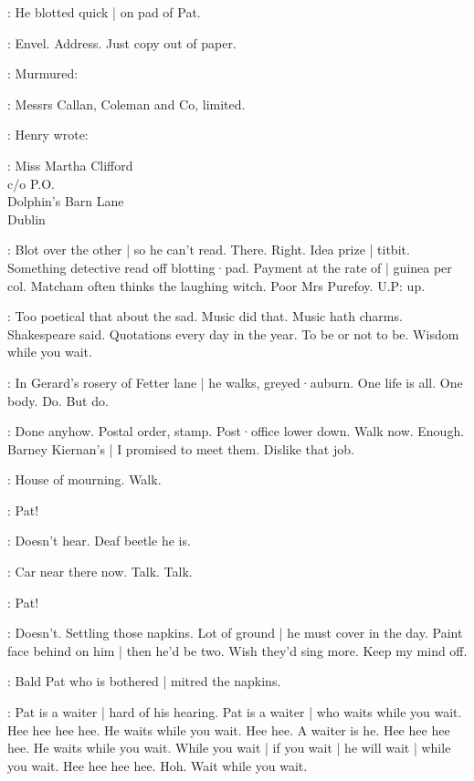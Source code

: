 :
He blotted quick |
on pad of Pat.

\BloomIntA:
Envel.
Address.
Just copy out of paper.

:
Murmured:

\BloomIntA:
Messrs Callan,
Coleman and Co,
limited.

:
Henry wrote:

:
    Miss Martha Clifford\\
    \-\hspace{3cm}    c/o P.O.\\
    \-\hspace{2cm} Dolphin's Barn Lane\\
    \-\hspace{3cm}    Dublin

\BloomIntA:
Blot over the other |
so he can't read.
There.
Right.
Idea prize |
titbit.
Something detective read off blotting·pad.
Payment at the rate of |
guinea per col.
Matcham often thinks the laughing witch.
Poor Mrs Purefoy.
U.P: up.

\BloomIntB:
Too poetical that about the sad.
Music did that.
Music hath charms.
Shakespeare said.
Quotations every day in the year.
To be or not to be.
Wisdom while you wait.

\BloomIntB:
In Gerard's rosery of Fetter lane |
he walks,
greyed·auburn.
One life is all.
One body.
Do.
But do.

\BloomIntA:
Done anyhow.
Postal order,
stamp.
Post·office lower down.
Walk now.
Enough.
Barney Kiernan's |
I promised to meet them.
Dislike that job.

\BloomIntA:
House of mourning.
Walk.

\Bloom:
Pat!

\BloomIntA:
Doesn't hear.
Deaf beetle he is.

\BloomIntA:
Car near there now.
Talk.
Talk.

\Bloom:
Pat!

\BloomIntA:
Doesn't.
Settling those napkins.
Lot of ground |
he must cover in the day.
Paint face behind on him |
then he'd be two.
Wish they'd sing more.
Keep my mind off.

:
Bald Pat who is bothered |
mitred the napkins.

\BloomIntA:
Pat is a waiter |
hard of his hearing.
Pat is a waiter |
who waits while you wait.
Hee hee hee hee.
He waits while you wait.
Hee hee.
A waiter is he.
Hee hee hee hee.
He waits while you wait.
While you wait |
if you wait |
he will wait |
while you wait.
Hee hee hee hee.
Hoh.
Wait while you wait.


